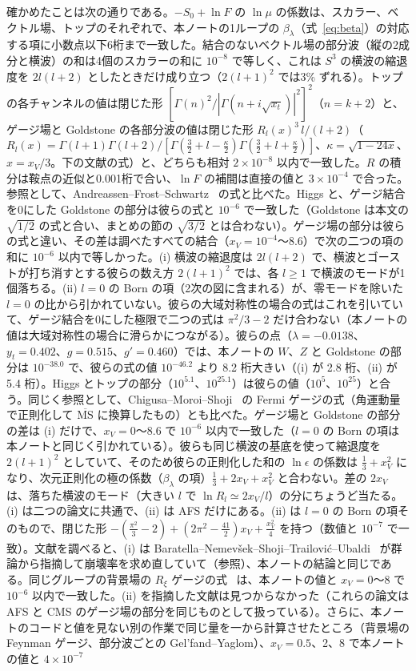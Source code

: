 \documentclass[a4paper,10pt]{ltjsarticle}
\newcommand{\MSbar}{\overline{\mathrm{MS}}}
\begin{document}
確かめたことは次の通りである。$-S_0+\ln F$ の $\ln\mu$ の係数は、スカラー、ベクトル場、トップのそれぞれで、本ノートの1ループの $\beta_\lambda$（式~\eqref{eq:beta}）の対応する項に小数点以下6桁まで一致した。結合のないベクトル場の部分波（縦の2成分と横波）の和は4個のスカラーの和に $10^{-8}$ で等しく、これは $S^3$ の横波の縮退度を $2l(l+2)$ としたときだけ成り立つ（$2(l+1)^2$ では3\% ずれる）。トップの各チャンネルの値は閉じた形 $[\Gamma(n)^2/|\Gamma(n+i\sqrt{x_t})|^2]^2$（$n=k+2$）と、ゲージ場と Goldstone の各部分波の値は閉じた形 $R_l(x)^3\,l/(l+2)$（$R_l(x)=\Gamma(l+1)\Gamma(l+2)/[\Gamma(\frac32+l-\frac\kappa2)\Gamma(\frac32+l+\frac\kappa2)]$、$\kappa=\sqrt{1-24x}$、$x=x_V/3$。下の文献の式）と、どちらも相対 $2\times10^{-8}$ 以内で一致した。$R$ の積分は鞍点の近似と0.001桁で合い、$\ln F$ の補間は直接の値と $3\times10^{-4}$ で合った。参照として、Andreassen--Frost--Schwartz~\cite{afs18} の式と比べた。Higgs と、ゲージ結合を0にした Goldstone の部分は彼らの式と $10^{-6}$ で一致した（Goldstone は本文の $\sqrt{1/2}$ の式と合い、まとめの節の $\sqrt{3/2}$ とは合わない）。ゲージ場の部分は彼らの式と違い、その差は調べたすべての結合（$x_V=10^{-4}$〜8.6）で次の二つの項の和に $10^{-6}$ 以内で等しかった。(i) 横波の縮退度は $2l(l+2)$ で、横波とゴーストが打ち消すとする彼らの数え方 $2(l+1)^2$ では、各 $l\ge1$ で横波のモードが1個落ちる。(ii) $l=0$ の Born の項（2次の図に含まれる）が、零モードを除いた $l=0$ の比から引かれていない。彼らの大域対称性の場合の式はこれを引いていて、ゲージ結合を0にした極限で二つの式は $\pi^2/3-2$ だけ合わない（本ノートの値は大域対称性の場合に滑らかにつながる）。彼らの点（$\lambda=-0.0138$、$y_t=0.402$、$g=0.515$、$g'=0.460$）では、本ノートの $W$、$Z$ と Goldstone の部分は $10^{-38.0}$ で、彼らの式の値 $10^{-46.2}$ より 8.2 桁大きい（(i) が 2.8 桁、(ii) が 5.4 桁）。Higgs とトップの部分（$10^{5.1}$、$10^{25.1}$）は彼らの値（$10^{5}$、$10^{25}$）と合う。同じく参照として、Chigusa--Moroi--Shoji~\cite{cms18} の Fermi ゲージの式（角運動量で正則化して $\MSbar$ に換算したもの）とも比べた。ゲージ場と Goldstone の部分の差は (i) だけで、$x_V=0$〜8.6 で $10^{-6}$ 以内で一致した（$l=0$ の Born の項は本ノートと同じく引かれている）。彼らも同じ横波の基底を使って縮退度を $2(l+1)^2$ としていて、そのため彼らの正則化した和の $\ln\epsilon$ の係数は $\frac13+x_V^2$ になり、次元正則化の極の係数（$\beta_\lambda$ の項）$\frac13+2x_V+x_V^2$ と合わない。差の $2x_V$ は、落ちた横波のモード（大きい $l$ で $\ln R_l\simeq2x_V/l$）の分にちょうど当たる。(i) は二つの論文に共通で、(ii) は AFS だけにある。(ii) は $l=0$ の Born の項そのもので、閉じた形 $-(\frac{\pi^2}3-2)+(2\pi^2-\frac{41}2)x_V+\frac{x_V^2}4$ を持つ（数値と $10^{-7}$ で一致）。文献を調べると、(i) は Baratella--Nemevšek--Shoji--Trailović--Ubaldi~\cite{bnstu24} が群論から指摘して崩壊率を求め直していて（参照）、本ノートの結論と同じである。同じグループの背景場の $R_\xi$ ゲージの式~\cite{bnstu25} は、本ノートの値と $x_V=0$〜8 で $10^{-6}$ 以内で一致した。(ii) を指摘した文献は見つからなかった（これらの論文は AFS と CMS のゲージ場の部分を同じものとして扱っている）。さらに、本ノートのコードと値を見ない別の作業で同じ量を一から計算させたところ（背景場の Feynman ゲージ、部分波ごとの Gel'fand--Yaglom）、$x_V=0.5$、2、8 で本ノートの値と $4\times10^{-7}$ 
\end{document}
